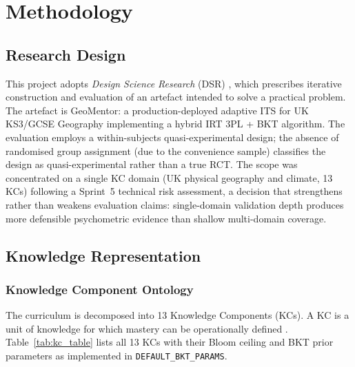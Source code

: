 \chapter{Methodology}
\label{ch:methodology}

\section{Research Design}
\label{sec:meth_design}

This project adopts \textit{Design Science Research} (DSR) \parencite{hevner2004},
which prescribes iterative construction and evaluation of an artefact intended
to solve a practical problem. The artefact is GeoMentor: a production-deployed
adaptive ITS for UK KS3/GCSE Geography implementing a hybrid IRT 3PL + BKT
algorithm. The evaluation employs a within-subjects quasi-experimental design;
the absence of randomised group assignment (due to the convenience sample)
classifies the design as quasi-experimental rather than a true RCT.
The scope was concentrated on a single KC domain (UK physical geography and
climate, 13 KCs) following a Sprint~5 technical risk assessment, a decision
that strengthens rather than weakens evaluation claims: single-domain
validation depth produces more defensible psychometric evidence than shallow
multi-domain coverage.

\section{Knowledge Representation}
\label{sec:meth_kc}

\subsection{Knowledge Component Ontology}
\label{subsec:meth_kc_ontology}

The curriculum is decomposed into 13 Knowledge Components (KCs). A KC is a
unit of knowledge for which mastery can be operationally defined
\parencite{koedinger2012}. Table~\ref{tab:kc_table} lists all 13 KCs with
their Bloom ceiling and BKT prior parameters as implemented in
\texttt{DEFAULT\_BKT\_PARAMS}.

